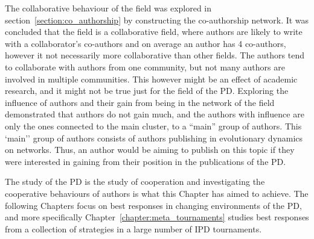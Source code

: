 The collaborative behaviour of the field was explored in
section~\ref{section:co_authorship} by constructing the co-authorship network.
It was concluded that the field is a collaborative field, where authors are
likely to write with a collaborator's co-authors and on average an author has 4
co-authors, however it not necessarily more collaborative than other fields. The
authors tend to collaborate with authors from one community, but not many
authors are involved in multiple communities. This however
might be an effect of academic research, and it might not be true just for the
field of the PD. Exploring the influence of authors and their gain from being in
the network of the field demonstrated that authors do not gain much, and the
authors with influence are only the ones connected to the main cluster, to a
``main'' group of authors. This `main'' group of authors consists of authors
publishing in evolutionary dynamics on networks. Thus, an author would be aiming
to publish on this topic if they were interested in gaining from their position
in the publications of the PD.

The study of the PD is the study of cooperation and investigating the
cooperative behaviours of authors is what this Chapter has aimed to achieve. The
following Chapters focus on best responses in changing environments of the PD,
and more specifically Chapter~\ref{chapter:meta_tournaments} studies best
responses from a collection of strategies in a large number of IPD tournaments.